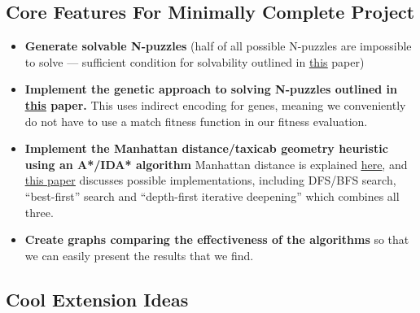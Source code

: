 \documentclass[12pt]{article}
\begin{document}
\subsection{Core Features For Minimally Complete Project}
\begin{itemize}
	\item \textbf{Generate solvable N-puzzles} (half of all possible N-puzzles are impossible to solve — sufficient condition for solvability outlined in \underline{\href{http://cseweb.ucsd.edu/~ccalabro/essays/15_puzzle.pdf}{this}} paper)
\item \textbf{Implement the genetic approach to solving N-puzzles outlined in \underline{\href{http://cseweb.ucsd.edu/~ccalabro/essays/15_puzzle.pdf}{this}} paper.} This uses indirect encoding for genes, meaning we conveniently do not have to use a match fitness function in our fitness evaluation. 
\item \textbf{Implement the Manhattan distance/taxicab geometry heuristic using an A*/IDA* algorithm} Manhattan distance is explained \underline{\href{http://theory.stanford.edu/~amitp/GameProgramming/Heuristics.html}{here}}, and \underline{\href{http://citeseerx.ist.psu.edu/viewdoc/download?doi=10.1.1.58.7&rep=rep1&type=pdf }{this paper}} discusses possible implementations, including DFS/BFS search, “best-first” search and “depth-first iterative deepening” which combines all three. 
\item \textbf{Create graphs comparing the effectiveness of the algorithms} so that we can easily present the results that we find.
\end{itemize}


\subsection{Cool Extension Ideas}
\end{document}
